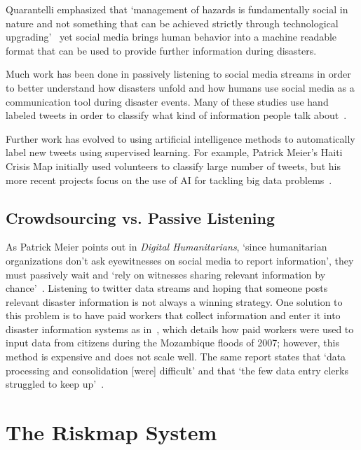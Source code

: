 Quarantelli emphasized that  `management of hazards is fundamentally social in
nature and not something that can be achieved strictly through technological
upgrading'~\cite{tierneyFacingUnexpectedDisaster2001} yet social media brings
human behavior into a machine readable format that can be used to provide
further information during disasters.

Much work has been done in passively listening to social media streams in order
to better understand how disasters unfold and how humans use social media as a
communication tool during disaster events. Many of these studies use hand
labeled tweets in order to classify what kind of information people talk
about~\cite{alamTwitterTaleThree2018}.

Further work has evolved to using artificial intelligence methods to
automatically label new tweets using supervised learning. For example, Patrick
Meier's Haiti Crisis Map initially used volunteers to classify large number of
tweets, but his more recent projects focus on the use of AI for tackling big
data problems~\cite{meierDigitalHumanitariansHow2015}.
\subsection{Crowdsourcing vs. Passive Listening} 
As Patrick Meier points out in \textit{Digital Humanitarians}, `since
humanitarian organizations don't ask eyewitnesses on social media to report
information', they must passively wait and `rely on witnesses sharing relevant
information by chance'~\cite{meierDigitalHumanitariansHow2015}. Listening to
twitter data streams and hoping that someone posts relevant disaster information
is not always a winning strategy. One solution to this problem is to have paid
workers that collect information and enter it into disaster information systems
as in~\cite{aminDataNaturalDisasters2008}, which details how paid workers were
used to input data from citizens during the Mozambique floods of 2007; however,
this method is expensive and does not scale well. The same report states that
`data processing and consolidation [were] difficult' and that `the few data
entry clerks struggled to keep up'~\cite{aminDataNaturalDisasters2008}.

\section{The Riskmap System}\label{chap1:riskmap}

